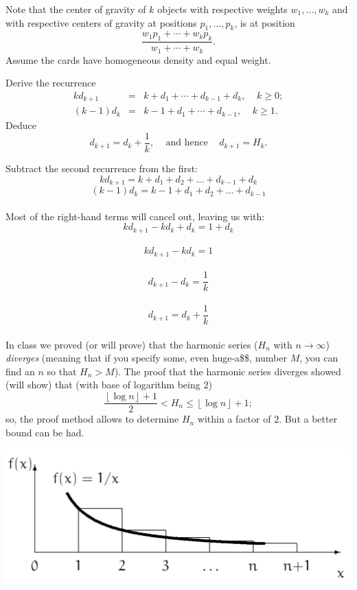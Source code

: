 \documentclass[10pt, AMS Euler]{article}
\begin{document}
	Note that the center of gravity of $k$ objects with respective weights $w_1, \dots, w_k$ and with respective centers of gravity at positions $p_1, \dots, p_k$, is at position 
	$$\frac{w_1p_1 + \cdots + w_kp_k}{w_1 + \cdots + w_k}.$$
	Assume the cards have homogeneous density and equal weight.  
	
	Derive the recurrence 
	\begin{eqnarray*} kd_{k+1} &=& k + d_1+\cdots +d_{k-1}+d_k, \;\;\;\; k \geq 0;\\
		(k-1)d_k &=& k -1 + d_1+ \cdots + d_{k-1}, \;\;\;\; k \geq 1.
	\end{eqnarray*}
	Deduce $$d_{k+1} = d_k + \frac{1}{k}, \;\;\;\mbox{ and hence } \;\;\;d_{k+1} = H_k.$$

    Subtract the second recurrence from the first:\\

    $$kd_{k+1} = k + d_1 + d_2 + ... + d_{k-1} + d_k$$
    $$(k-1)d_k = k-1+d_1+d_2+...+d_{k-1}$$ \\
    Most of the right-hand terms will cancel out, leaving us with:\\

    $$kd_{k+1}-kd_k+d_k=1+d_k$$\\
    $$kd_{k+1}-kd_k=1$$\\
    $$d_{k+1}-d_k=\frac{1}{k}$$\\
    $$d_{k+1}=d_k + \frac{1}{k}$$\\
	
	
	In class we proved (or will prove) that the harmonic series ($H_n$ with $n \to \infty$) 
	\emph{diverges} (meaning that if you specify some, even huge-a\$\$, number $M$, you can find an $n$ so that $H_n> M$).  
	The proof that the harmonic series diverges showed (will show) that (with base of logarithm being $2$)
	$$\frac{\left\lfloor \log{n}\right\rfloor +1}{2} < H_n \leq \left\lfloor \log{n}\right\rfloor +1;$$
	so, the proof method allows to determine $H_n$ within a factor of $2$. 
	But a better bound can be had.  
	
	\begin{center}
		\includegraphics[scale=0.4]{Figures/Harmonic_Left.pdf}
	\end{center}
	
\end{document}
